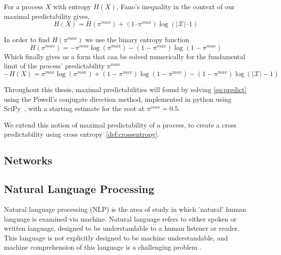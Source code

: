 \begin{definition}
For a process $X$ with entropy $H(X)$, Fano's inequality in the context of our maximal predictability gives,
\begin{equation}
H(X) = H(\pi^{max}) + (1 – \pi^{max}) \log (|\mathcal{X}| – 1)
\end{equation}
\end{definition}
In order to find $H(\pi^{max})$ we use the binary entropy function~\cite{song_limits_2010}
\begin{equation}
H(\pi^{max}) = -\pi^{max} \log(\pi^{max}) - (1 -  \pi^{max}) \log(1 - \pi^{max})
\end{equation}
Which finally gives us a form that can be solved numerically for the fundamental limit of the process' predictability $\pi^{max}$
\begin{equation}\label{eq:predict}
-H(X)  = \pi^{max} \log(\pi^{max}) + (1 -  \pi^{max}) \log(1 - \pi^{max}) - (1 - \pi^{max}) \log (|\mathcal{X}| - 1)
\end{equation}



Throughout this thesis, maximal predictabilities will found by solving \autoref{eq:predict} using the Powell's conjugate direction method, implemented in python using SciPy~\cite{virtanen_scipy_2019}, with a starting estimate for the root at $\pi^{max}=0.5$.


We extend this notion of maximal predictability of a process, to create a cross predictability using cross entropy~\autoref{def:crossentropy}.



\subsection{Networks}















\subsection{Natural Language Processing}

Natural language processing (NLP) is the area of study in which 'natural' human language is examined via machine. Natural language refers to either spoken or written language, designed to be understandable to a human listener or reader. This language is not explicitly designed to be machine understandable, and machine comprehension of this language is a challenging problem .

